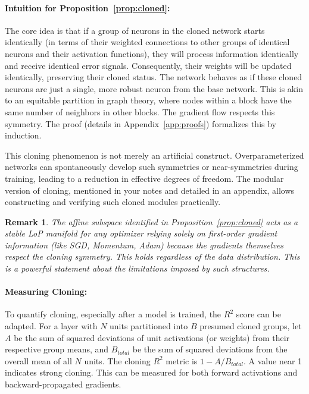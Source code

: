 \documentclass{article}
\newtheorem{remark}{Remark}[section]
\begin{document}
\paragraph{Intuition for Proposition~\ref{prop:cloned}:}
The core idea is that if a group of neurons in the cloned network starts identically (in terms of their weighted connections to other groups of identical neurons and their activation functions), they will process information identically and receive identical error signals. Consequently, their weights will be updated identically, preserving their cloned status. The network behaves as if these cloned neurons are just a single, more robust neuron from the base network. This is akin to an equitable partition in graph theory, where nodes within a block have the same number of neighbors in other blocks. The gradient flow respects this symmetry. The proof (details in Appendix~\ref{app:proofs}) formalizes this by induction.

This cloning phenomenon is not merely an artificial construct. Overparameterized networks can spontaneously develop such symmetries or near-symmetries during training, leading to a reduction in effective degrees of freedom. The modular version of cloning, mentioned in your notes and detailed in an appendix, allows constructing and verifying such cloned modules practically.

\begin{remark}
The affine subspace identified in Proposition~\ref{prop:cloned} acts as a stable LoP manifold for any optimizer relying solely on first-order gradient information (like SGD, Momentum, Adam) because the gradients themselves respect the cloning symmetry. This holds regardless of the data distribution. This is a powerful statement about the limitations imposed by such structures.
\end{remark}

\paragraph{Measuring Cloning:}
To quantify cloning, especially after a model is trained, the $R^2$ score can be adapted. For a layer with $N$ units partitioned into $B$ presumed cloned groups, let $A$ be the sum of squared deviations of unit activations (or weights) from their respective group means, and $B_{total}$ be the sum of squared deviations from the overall mean of all $N$ units. The cloning $R^2$ metric is $1 - A/B_{total}$. A value near 1 indicates strong cloning. This can be measured for both forward activations and backward-propagated gradients.
\end{document}
